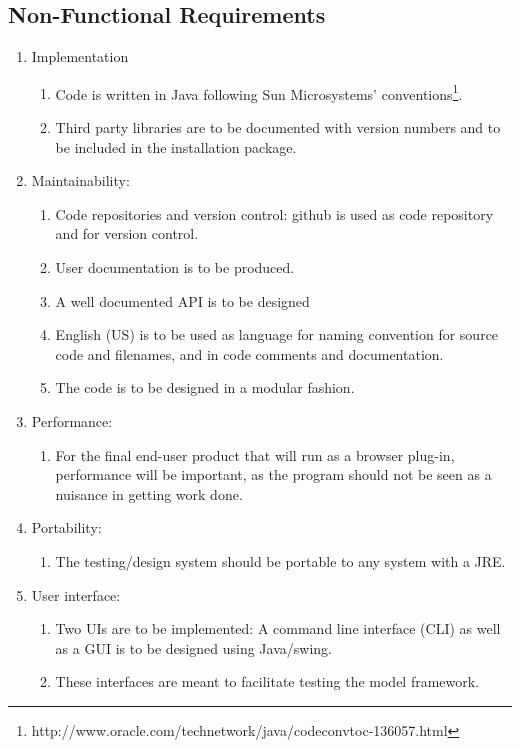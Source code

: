 \subsection{Non-Functional Requirements}
\begin{enumerate}
\item Implementation
  \begin{enumerate}
  \item Code is written in Java following Sun Microsystems' conventions\footnote{http://www.oracle.com/technetwork/java/codeconvtoc-136057.html}.
  \item Third party libraries are to be documented with version numbers and to be included in the installation package.
\end{enumerate}

\item Maintainability:
  \begin{enumerate}
  \item Code repositories and version control: github is used as code repository and for version control.
  \item User documentation is to be produced.
  \item A well documented API is to be designed	
  \item English (US) is to be used as language for naming convention for source code and filenames, and in code comments and documentation.
  \item The code is to be designed in a modular fashion.
  \end{enumerate}

\item Performance: 
  \begin{enumerate}
  \item For the final end-user product that will run as a browser plug-in, performance will be important, as the program should not be seen as a nuisance in getting work done.
  \end{enumerate}

\item Portability: 
  \begin{enumerate}
  \item The testing/design system should be portable to any system with a JRE.
  \end{enumerate}

\item User interface:
  \begin{enumerate}
  \item Two UIs are to be implemented: A command line interface (CLI) as well as a GUI is to be designed using Java/swing.
  \item These interfaces are meant to facilitate testing the model framework.
  \end{enumerate}


\end{enumerate}
